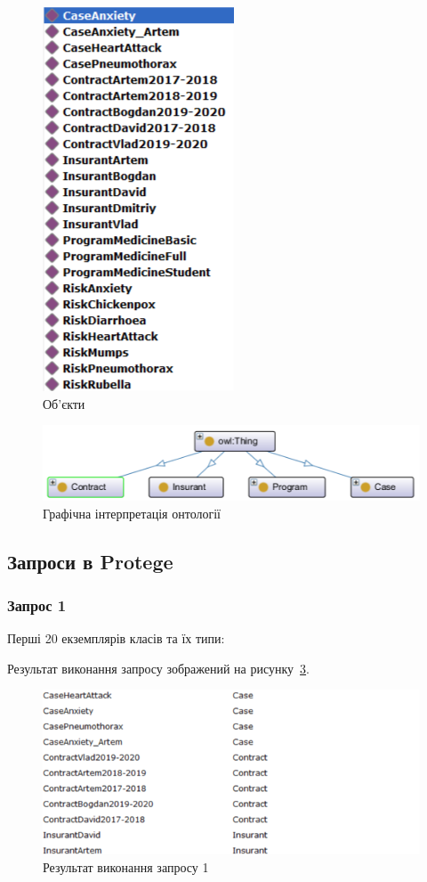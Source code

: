 \begin{figure}[H]
	\centering
	    \includegraphics{individuals}
	\caption{Об'єкти}
	\label{fig:individuals}
\end{figure}

\begin{figure}[H]
	\centering
	    \includegraphics{ontograph}
	\caption{Графічна інтерпретація онтології}
	\label{fig:ontograph}
\end{figure}

\subsection{Запроси в Protege}
\subsubsection*{Запрос 1}
Перші 20 екземплярів класів та їх типи:
 

Результат виконання запросу зображений на рисунку~\ref{fig:sparql_1}.

\begin{figure}[H]
	\centering
	    \includegraphics{sparql_1}
	\caption{Результат виконання запросу 1}
	\label{fig:sparql_1}
\end{figure}

